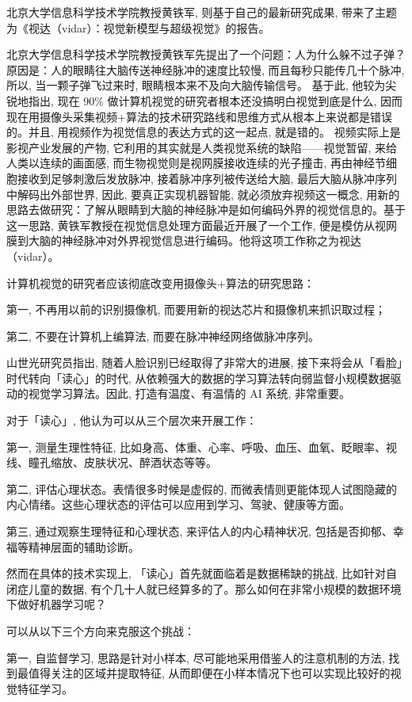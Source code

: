 北京大学信息科学技术学院教授黄铁军, 则基于自己的最新研究成果, 带来了主题为《视达（vidar）：视觉新模型与超级视觉》的报告。


北京大学信息科学技术学院教授黄铁军先提出了一个问题：人为什么躲不过子弹？原因是：人的眼睛往大脑传送神经脉冲的速度比较慢, 而且每秒只能传几十个脉冲, 所以, 当一颗子弹飞过来时, 眼睛根本来不及向大脑传输信号。
基于此, 他较为尖锐地指出, 现在 90\% 做计算机视觉的研究者根本还没搞明白视觉到底是什么, 因而现在用摄像头采集视频+算法的技术研究路线和思维方式从根本上来说都是错误的。并且, 用视频作为视觉信息的表达方式的这一起点, 就是错的。
视频实际上是影视产业发展的产物, 它利用的其实就是人类视觉系统的缺陷——视觉暂留, 来给人类以连续的画面感, 而生物视觉则是视网膜接收连续的光子撞击, 再由神经节细胞接收到足够刺激后发放脉冲, 接着脉冲序列被传送给大脑, 最后大脑从脉冲序列中解码出外部世界,
因此, 要真正实现机器智能, 就必须放弃视频这一概念, 用新的思路去做研究：了解从眼睛到大脑的神经脉冲是如何编码外界的视觉信息的。基于这一思路, 黄铁军教授在视觉信息处理方面最近开展了一个工作, 便是模仿从视网膜到大脑的神经脉冲对外界视觉信息进行编码。他将这项工作称之为视达（vidar）。

计算机视觉的研究者应该彻底改变用摄像头+算法的研究思路：

第一, 不再用以前的识别摄像机, 而要用新的视达芯片和摄像机来抓识取过程；

第二, 不要在计算机上编算法, 而要在脉冲神经网络做脉冲序列。

山世光研究员指出, 随着人脸识别已经取得了非常大的进展, 接下来将会从「看脸」时代转向「读心」的时代, 从依赖强大的数据的学习算法转向弱监督小规模数据驱动的视觉学习算法。因此, 打造有温度、有温情的 AI 系统, 非常重要。

对于「读心」, 他认为可以从三个层次来开展工作：

第一, 测量生理性特征, 比如身高、体重、心率、呼吸、血压、血氧、眨眼率、视线、瞳孔缩放、皮肤状况、醉酒状态等等。

第二, 评估心理状态。表情很多时候是虚假的, 而微表情则更能体现人试图隐藏的内心情绪。这些心理状态的评估可以应用到学习、驾驶、健康等方面。

第三, 通过观察生理特征和心理状态, 来评估人的内心精神状况, 包括是否抑郁、幸福等精神层面的辅助诊断。

然而在具体的技术实现上, 「读心」首先就面临着是数据稀缺的挑战, 比如针对自闭症儿童的数据, 有个几十人就已经算多的了。那么如何在非常小规模的数据环境下做好机器学习呢？

可以从以下三个方向来克服这个挑战：

第一, 自监督学习, 思路是针对小样本, 尽可能地采用借鉴人的注意机制的方法, 找到最值得关注的区域并提取特征, 从而即便在小样本情况下也可以实现比较好的视觉特征学习。

